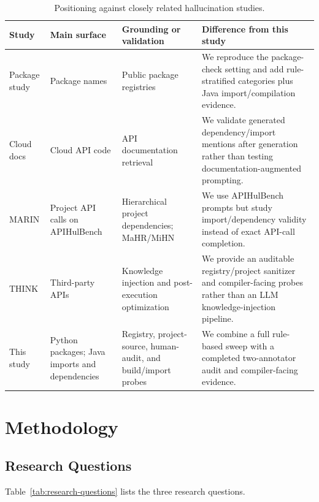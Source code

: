\documentclass[pdflatex,sn-basic]{sn-jnl}
\begin{document}
\begin{table}[htbp]
\caption{Positioning against closely related hallucination studies.}
\footnotesize
\setlength{\tabcolsep}{3pt}
\begin{tabularx}{\linewidth}{@{}L{22mm}L{31mm}L{38mm}Y@{}}
\toprule
Study & Main surface & Grounding or validation & Difference from this study \\
\midrule
Package study\citep{Spracklen2025} & Package names & Public package registries & We reproduce the package-check setting and add rule-stratified categories plus Java import/compilation evidence. \\
Cloud docs\citep{Jain2024} & Cloud API code & API documentation retrieval & We validate generated dependency/import mentions after generation rather than testing documentation-augmented prompting. \\
MARIN\citep{Chen2025MARIN} & Project API calls on APIHulBench & Hierarchical project dependencies; MaHR/MiHN & We use APIHulBench prompts but study import/dependency validity instead of exact API-call completion. \\
THINK\citep{Liu2025THINK} & Third-party APIs & Knowledge injection and post-execution optimization & We provide an auditable registry/project sanitizer and compiler-facing probes rather than an LLM knowledge-injection pipeline. \\
This study & Python packages; Java imports and dependencies & Registry, project-source, human-audit, and build/import probes & We combine a full rule-based sweep with a completed two-annotator audit and compiler-facing evidence. \\
\bottomrule
\end{tabularx}
\label{tab:related-comparison}
\end{table}

\section{Methodology}

\subsection{Research Questions}

Table~\ref{tab:research-questions} lists the three research questions.
\end{document}
